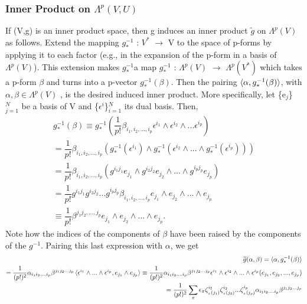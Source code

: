 \documentclass[12pt,a4paper]{article}
\begin{document}
\subsubsection{Inner Product on $\Lambda^{p}(V, U)$}
If (V,g) is an inner product space, then g induces an inner product $\widetilde{g}$ on $\Lambda^{p}(V)$ as follows. Extend the mapping $g_*^{-1}$ : $V^*$ $\to$ V to the space of p-forms by applying it to each factor (e.g., in the expansion of the p-form in a
basis of $\Lambda^{p}(V)$). This extension makes $g_*^{-1}$a map $g_*^{-1}$ : $\Lambda^{p}(V)$ $\to$ $\Lambda^{p}(V^*)$ which takes a p-form $\beta$ and turns into a p-vector $g_*^{-1} (\beta)$. Then the pairing $\braket{\alpha, g_*^{-1}(\beta)}$, with $\alpha, \beta \in \Lambda^{p}(V)$ , is the desired induced inner product. More
specifically, let \{e$_j$\}$^N_{j=1}$  be a basis of V and \{$\epsilon$$^i$\}$^N_{i=1}$ its dual basis. Then,
\begin{eqnarray*}
g_*^{-1} (\beta) \equiv g_*^{-1} ( \dfrac{1}{p!} \beta_{i_1, i_2,...,i_p} \epsilon^{i_1} \wedge \epsilon^{i_2} \wedge ... \epsilon^{i_p} ) \\
= \dfrac{1}{p!} \beta_{i_1, i_2,...,i_p} (g_*^{-1}(\epsilon^{i_1}) \wedge g_*^{-1} (\epsilon^{i_2} \wedge ... \wedge g_*^{-1} (\epsilon^{i_p})))\\
=\dfrac{1}{p!} \beta_{i_1, i_2,...,i_p} ( g^{i_1 j_1} e_{j_1} \wedge g^{i_2 j_2} e_{j_2} \wedge ... \wedge g^{i_p j_p} e_{j_p})\\
=\dfrac{1}{p!} g^{i_1 j_1} g^{i_2 j_2} ... g^{i_p j_p}  \beta_{i_1, i_2,...,i_p} e_{j_1} \wedge e_{j_2} \wedge ... \wedge e_{j_p} \\
\equiv \dfrac{1}{p!} \beta^{j_1 j_2, ... , j_p}  e_{j_1} \wedge e_{j_2} \wedge ... \wedge e_{j_p} .
\end{eqnarray*}
Note how the indices of the components of $\beta$ have been raised by the components of the $g^{-1}$. Pairing this last expression with $\alpha$, we get
\begin{eqnarray*}
\widetilde{g} (\alpha, \beta) = \braket{\alpha, g_*^{-1}(\beta)}\\
=\dfrac{1}{(p!)^2} \alpha_{i_1 i_2 .... i_p} \beta^{j_1 j_2 ... j_p} \braket{ \epsilon^{i_1} \wedge ... \wedge \epsilon^{i_p}, e_{j_1} \wedge e_{j_p}}  
\equiv \dfrac{1}{(p!)^2} \alpha_{i_1 i_2 .... i_p} \beta^{j_1 j_2 ... j_p}  \epsilon^{i_1} \wedge \epsilon^{i_2} \wedge ... \wedge \epsilon^{i_p} (e_{j_1}, e_{j_2}, ..., e_{j_p})       \\
= \dfrac{1}{(p!)^2} \sum_\pi \epsilon_\pi \zeta^{i_1}_{_\pi(j_1)} \zeta^{i_2}_{_\pi(j_2)} ... \zeta^{i_p}_{_\pi(j_p)} \alpha_{i_1 i_2 .... i_p} \beta^{j_1 j_2 ... j_p}

\end{eqnarray*}$$
\end{document}
